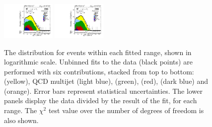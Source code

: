 \begin{figure}[htb!]
\begin{tiny}
\includegraphics[width=0.23\textwidth]{Figures/WBoson/Analysis/SignalExtraction/Signal/LOG/PLOT_MET_DATA_WToMuMi_PA_Model_TEMP_WDYDYToTauWToTauTTbar_ModifiedRayleigh_QCD_MuEtaCM_160_180_MuIso_0_15.pdf}
\includegraphics[width=0.23\textwidth]{Figures/WBoson/Analysis/SignalExtraction/Signal/LOG/PLOT_MET_DATA_WToMuMi_PA_Model_TEMP_WDYDYToTauWToTauTTbar_ModifiedRayleigh_QCD_MuEtaCM_180_193_MuIso_0_15.pdf}
\end{tiny}
\caption{The \ptmiss distribution for \WToMuNuMi events within each fitted \etaMuCM range, shown in logarithmic scale. Unbinned fits to the data (black points) are performed with six contributions, stacked from top to bottom: \WToMuNuPl (yellow), QCD multijet (light blue), \DYToMuMu (green), \WToTauNuPl (red), \DYToTauTau (dark blue) and \ttbar (orange). Error bars represent statistical uncertainties. The lower panels display the data divided by the result of the fit, for each \etaMuCM range. The $\chi^{2}$ test value over the number of degrees of freedom is also shown.}
\label{fig:METFits_WToMuMi_PA}
 
\end{figure}


